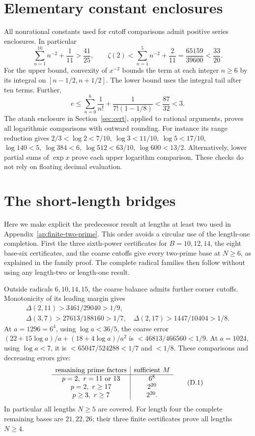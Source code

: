 \documentclass[11pt]{article}
\theoremstyle{definition}\newtheorem{definition}[theorem]{Definition}
\theoremstyle{remark}\newtheorem{remark}[theorem]{Remark}
\begin{document}
\section{Elementary constant enclosures}\label{app:constants}
All nonrational constants used for cutoff comparisons admit positive
series enclosures. In particular
\[
 \sum_{n=1}^{10}n^{-2}+\frac1{11}>\frac{41}{25},\qquad
 \zeta(2)<\sum_{n=1}^{5}n^{-2}+\frac2{11}
          =\frac{65159}{39600}<\frac{33}{20}.
\]
For the upper bound, convexity of \(x^{-2}\) bounds the term at each
integer \(n\ge6\) by its integral on \([n-1/2,n+1/2]\).
The lower bound uses the integral tail after ten terms.
Further,
\[
 e\le\sum_{n=0}^{6}\frac1{n!}
             +\frac{1}{7!(1-1/8)}<\frac{87}{32}<3.
\]
The atanh enclosure in Section~\ref{sec:cert}, applied to rational
arguments, proves all logarithmic comparisons with outward rounding.
For instance its range reduction gives
\(2/3<\log2<7/10,\ \log3<11/10,\ \log5<17/10\),
\(\log140<5,\ \log384<6,\ \log512<63/10,\ \log600<13/2\).
Alternatively, lower partial sums of \(\exp x\) prove each upper
logarithm comparison. These checks do not rely on floating decimal
evaluation.


\section{The short-length bridges}\label{app:shortlength}
Here we make explicit the predecessor result at lengths at least two
used in Appendix~\ref{ap:finite-two-prime}. This order avoids a circular
use of the length-one completion.
First the three sixth-power certificates for \(B=10,12,14\), the eight
base-six certificates, and the coarse cutoffs give every two-prime base
at \(N\ge6\), as explained in the family proof.
The complete radical families then follow without using any
length-two or length-one result.

Outside radicals \(6,10,14,15\), the coarse balance admits further
corner cutoffs. Monotonicity of its leading margin gives
\[
 \begin{gathered}
 \Delta(2,11)>3461/29040>1/9,\\
 \Delta(3,7)>27613/188160>1/7,\quad
 \Delta(2,17)>1447/10404>1/8 .
 \end{gathered}
\]
At \(a=1296=6^4\), using \(\log a<36/5\), the coarse error
\((22+15\log a)/a+(18+4\log a)/a^2\)
is \(<46813/466560<1/9\).
At \(a=1024\), using \(\log a<7\), it is
\(<65047/524288<1/7\) and \(<1/8\).
These comparisons and decreasing errors give:
\[
 \begin{array}{c|c}
 \hbox{remaining prime factors}&\hbox{sufficient }M\\\hline
 p=2,\ r=11\hbox{ or }13&6^8\\
 p=2,\ r\ge17&2^{20}\\
 p\ge3,\ r\ge7&2^{20}.
 \end{array}                                                    \tag{D.1}
\]
In particular all lengths \(N\ge5\) are covered.
For length four the complete remaining bases are \(21,22,26\);
their three finite certificates prove all lengths \(N\ge4\).
\end{document}

